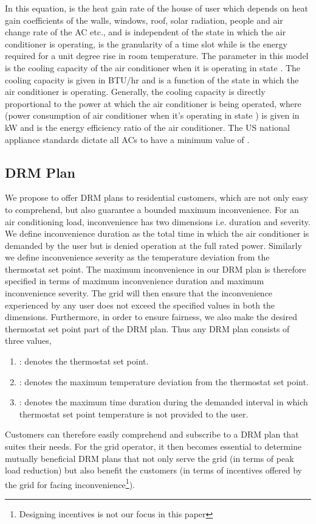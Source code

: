 \documentclass[10pt,twocolumn,twoside]{IEEEtran}
\begin{document}
In this equation,  is the heat gain rate of the house of user  which depends on heat gain coefficients of the walls, windows, roof, solar radiation, people and air change rate of the AC etc., and is independent of the state  in which the air conditioner is operating,  is the granularity of a time slot while  is the energy required for a unit degree rise in room temperature. The parameter  in this model is the cooling capacity of the air conditioner when it is operating in state . The cooling capacity is given in BTU/hr and is a function of the state  in which the air conditioner is operating. Generally, the cooling capacity is directly proportional to the power at which the air conditioner is being operated, 
where  (power consumption of air conditioner when it's operating in state ) is given in kW and  is the energy efficiency ratio of the air conditioner. The US national appliance standards dictate all ACs to have a minimum value of  \cite{energygov}.

\subsection{DRM Plan}
We propose to offer DRM plans to residential customers, which are not only easy to comprehend, but also guarantee a bounded maximum inconvenience. For an air conditioning load, inconvenience has two dimensions i.e. duration and severity. We define inconvenience duration as the total time in which the air conditioner is demanded by the user but is denied operation at the full rated power. Similarly we define inconvenience severity as the temperature deviation from the thermostat set point. The maximum inconvenience in our DRM plan is therefore specified in terms of maximum inconvenience duration and maximum inconvenience severity. The grid will then ensure that the inconvenience experienced by any user does not exceed the specified values in both the dimensions. 
Furthermore, in order to ensure fairness, we also make the desired thermostat set point part of the DRM plan. Thus any DRM plan consists of three values, 
\begin{enumerate}
	\item : denotes the thermostat set point. 
	\item : denotes the maximum temperature deviation from the thermostat set point.
	\item : denotes the maximum time duration during the demanded interval in which thermostat set point temperature is not provided to the user.
\end{enumerate}
Customers can therefore easily comprehend and subscribe to a DRM plan that suites their needs. For the grid operator, it then becomes essential to determine mutually beneficial DRM plans that not only serve the grid (in terms of peak load reduction) but also benefit the customers (in terms of incentives offered by the grid for facing inconvenience\footnote{Designing incentives is not our focus in this paper}). 
\end{document}
